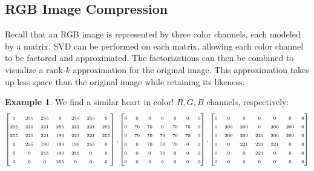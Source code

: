 \documentclass[12pt, reqno]{amsart}
\theoremstyle{definition}
\newtheorem{example}[theorem]{Example}
\theoremstyle{remark}
\numberwithin{equation}{section}
\begin{document}
\subsection{RGB Image Compression}
Recall that an RGB image is represented by three color channels, each modeled by a matrix. SVD can be performed on each matrix, allowing each color channel to be factored and approximated. The factorizations can then be combined to visualize a rank-$k$ approximation for the original image. This approximation takes up less space than the original image while retaining its likeness.
\begin{example}
    We find a similar heart in color! $R, G, B$ channels, respectively:
    \begin{equation*}
        \fontsize{6pt}{1pt}
        \begin{bmatrix}
            0 & 255 & 255 & 0 & 255 & 255 & 0 \\
            255 & 221 & 221 & 255 & 221 & 221 & 255 \\
            255 & 221 & 221 & 190 & 221 & 221 & 255 \\
            0 & 255 & 190 & 190 & 190 & 255 & 0 \\
            0 & 0 & 255 & 190 & 255 & 0 & 0 \\
            0 & 0 & 0 & 255 & 0 & 0 & 0
        \end{bmatrix},
         \begin{bmatrix}
            0 & 0 & 0 & 0 & 0 & 0 & 0 \\
            0 & 70 & 70 & 0 & 70 & 70 & 0 \\
            0 & 70 & 70 & 70 & 70 & 70 & 0 \\
            0 & 0 & 70 & 70 & 70 & 0 & 0 \\
            0 & 0 & 0 & 70 & 0 & 0 & 0 \\
            0 & 0 & 0 & 0 & 0 & 0 & 0\\
        \end{bmatrix},
         \begin{bmatrix}
            0 & 0 & 0 & 0 & 0 & 0 & 0 \\
            0 & 200 & 200 & 0 & 200 & 200 & 0 \\
            0 & 200 & 200 & 221 & 200 & 200 & 0 \\
            0 & 0 & 221 & 221 & 221 & 0 & 0 \\
            0 & 0 & 0 & 221 & 0 & 0 & 0 \\
            0 & 0 & 0 & 0 & 0 & 0 & 0\\

\end{bmatrix}
\end{equation*}
\end{example}
\end{document}
